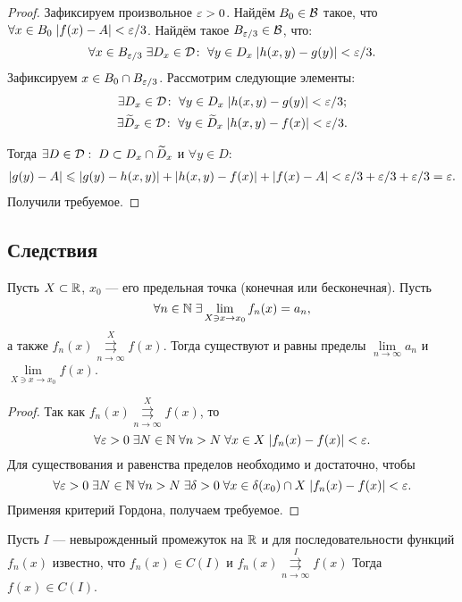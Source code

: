 \documentclass[a4paper, 12pt]{article}
\begin{document}
\begin{proof}
    Зафиксируем произвольное $\varepsilon > 0$. Найдём  $B_0 \in \mathcal{B}$ такое, что $\forall x\in B_0\; |f(x) - A| < \varepsilon/3$. Найдём такое $B_{\varepsilon/3} \in \mathcal{B}$, что: 
    $$
        \forall x\in B_{\varepsilon/3}\; \exists D_x\in \mathcal{D}\colon \; \forall y\in D_x\; |h(x,y) - g(y)| < \varepsilon/3.
    $$
    Зафиксируем $x\in B_0\cap B_{\varepsilon/3}$. Рассмотрим следующие элементы:
    \begin{gather}
        \exists D_x \in \mathcal{D}\colon\;\forall y\in D_x \; |h(x,y) - g(y)| <\varepsilon/3;\\
        \exists \widetilde{D}_x\in \mathcal{D}\colon \; \forall y\in \widetilde{D}_x\; |h(x,y) - f(x)| < \varepsilon/3.
    \end{gather}
    
    Тогда $\exists D\in \mathcal{D}:\; D \subset D_x \cap \widetilde{D}_x$ и $\forall y \in D$:    
    \begin{gather}
        |g(y) - A| \leqslant |g(y) - h(x,y)| + |h(x,y) - f(x)| + |f(x) - A| < \varepsilon/3 + \varepsilon/3 + \varepsilon/3 = \varepsilon.
    \end{gather}
    Получили требуемое.
\end{proof}

\subsection{Следствия}

\begin{Theorem}
    Пусть $X\subset \mathbb{R}$, $x_0$ --- его предельная точка (конечная или бесконечная). Пусть 
    $$
        \forall n \in \mathbb{N}\; \exists \lim\limits_{X\owns x \to x_0} f_n(x) = a_n,
    $$
    а также $f_n(x)\overset{X}{\underset{n\to\infty}{\rightrightarrows}} f(x)$. Тогда  существуют и равны пределы $\lim\limits_{n \to \infty}a_n$ и $\lim\limits_{X \owns x\to x_0} f(x)$.
\end{Theorem}
\begin{proof}
    Так как $f_n(x)\overset{X}{\underset{n\to\infty}{\rightrightarrows}} f(x)$, то
    $$
        \forall \varepsilon >0\; \exists N\in \mathbb{N}\; \forall n>N\; \forall x \in X\; |f_n(x) - f(x)| < \varepsilon.
    $$
    Для существования и равенства пределов необходимо и достаточно, чтобы
    $$
        \forall \varepsilon > 0\; \exists N \in \mathbb{N}\; \forall n>N\; \exists \delta >0\; \forall x\in \delta(x_0)\cap X\; |f_n(x) - f(x)| < \varepsilon.
    $$
    Применяя критерий Гордона, получаем требуемое.
\end{proof}
\begin{Consequence}
    Пусть $I$ --- невырожденный промежуток на $\mathbb{R}$ и для последовательности функций $f_n(x)$ известно, что $f_n(x) \in C(I)$ и $f_n(x)\overset{I}{\underset{n\to\infty}{\rightrightarrows}} f(x)$
    Тогда $f(x) \in C(I)$.
\end{Consequence}
\end{document}
